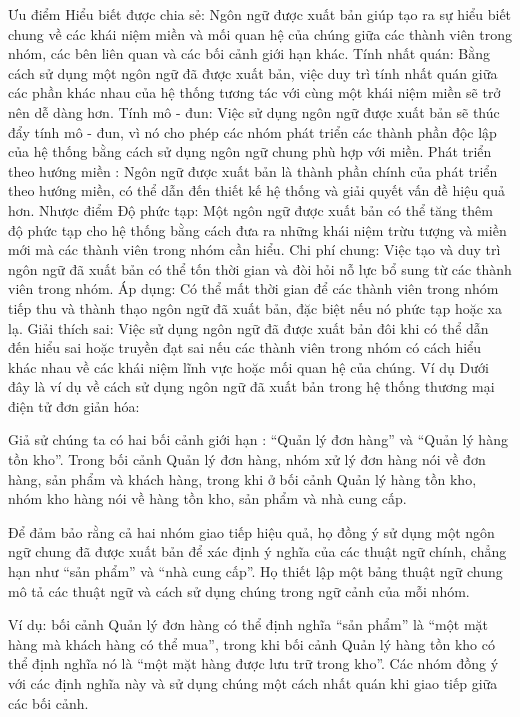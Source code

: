 Ưu điểm
Hiểu biết được chia sẻ: Ngôn ngữ được xuất bản giúp tạo ra sự hiểu biết chung về các khái niệm miền và mối quan hệ của chúng giữa các thành viên trong nhóm, các bên liên quan và các bối cảnh giới hạn khác.
Tính nhất quán: Bằng cách sử dụng một ngôn ngữ đã được xuất bản, việc duy trì tính nhất quán giữa các phần khác nhau của hệ thống tương tác với cùng một khái niệm miền sẽ trở nên dễ dàng hơn.
Tính mô - đun: Việc sử dụng ngôn ngữ được xuất bản sẽ thúc đẩy tính mô - đun, vì nó cho phép các nhóm phát triển các thành phần độc lập của hệ thống bằng cách sử dụng ngôn ngữ chung phù hợp với miền.
Phát triển theo hướng miền : Ngôn ngữ được xuất bản là thành phần chính của phát triển theo hướng miền, có thể dẫn đến thiết kế hệ thống và giải quyết vấn đề hiệu quả hơn.
Nhược điểm
Độ phức tạp: Một ngôn ngữ được xuất bản có thể tăng thêm độ phức tạp cho hệ thống bằng cách đưa ra những khái niệm trừu tượng và miền mới mà các thành viên trong nhóm cần hiểu.
Chi phí chung: Việc tạo và duy trì ngôn ngữ đã xuất bản có thể tốn thời gian và đòi hỏi nỗ lực bổ sung từ các thành viên trong nhóm.
Áp dụng: Có thể mất thời gian để các thành viên trong nhóm tiếp thu và thành thạo ngôn ngữ đã xuất bản, đặc biệt nếu nó phức tạp hoặc xa lạ.
Giải thích sai: Việc sử dụng ngôn ngữ đã được xuất bản đôi khi có thể dẫn đến hiểu sai hoặc truyền đạt sai nếu các thành viên trong nhóm có cách hiểu khác nhau về các khái niệm lĩnh vực hoặc mối quan hệ của chúng.
Ví dụ
Dưới đây là ví dụ về cách sử dụng ngôn ngữ đã xuất bản trong hệ thống thương mại điện tử đơn giản hóa:

Giả sử chúng ta có hai bối cảnh giới hạn : “Quản lý đơn hàng” và “Quản lý hàng tồn kho”. Trong bối cảnh Quản lý đơn hàng, nhóm xử lý đơn hàng nói về đơn hàng, sản phẩm và khách hàng, trong khi ở bối cảnh Quản lý hàng tồn kho, nhóm kho hàng nói về hàng tồn kho, sản phẩm và nhà cung cấp.

Để đảm bảo rằng cả hai nhóm giao tiếp hiệu quả, họ đồng ý sử dụng một ngôn ngữ chung đã được xuất bản để xác định ý nghĩa của các thuật ngữ chính, chẳng hạn như “sản phẩm” và “nhà cung cấp”. Họ thiết lập một bảng thuật ngữ chung mô tả các thuật ngữ và cách sử dụng chúng trong ngữ cảnh của mỗi nhóm.

Ví dụ: bối cảnh Quản lý đơn hàng có thể định nghĩa “sản phẩm” là “một mặt hàng mà khách hàng có thể mua”, trong khi bối cảnh Quản lý hàng tồn kho có thể định nghĩa nó là “một mặt hàng được lưu trữ trong kho”. Các nhóm đồng ý với các định nghĩa này và sử dụng chúng một cách nhất quán khi giao tiếp giữa các bối cảnh.

